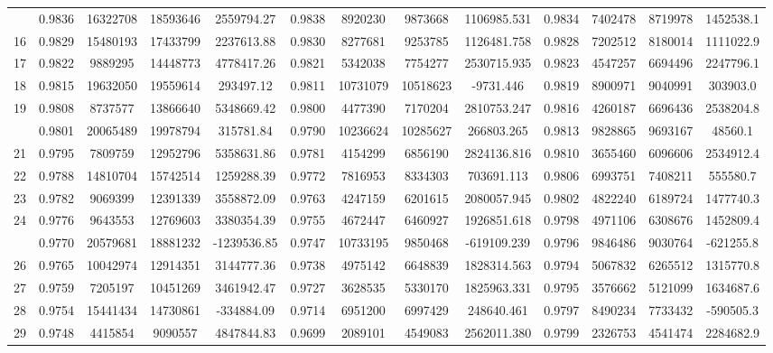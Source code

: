 \documentclass[
  12pt,
]{article}
\begin{document}
\begin{longtable}[t]{lcccccccccccc}
\addlinespace
15 & 0.9836 & 16322708 & 18593646 & 2559794.27 & 0.9838 & 8920230 & 9873668 & 1106985.531 & 0.9834 & 7402478 & 8719978 & 1452538.1\\
16 & 0.9829 & 15480193 & 17433799 & 2237613.88 & 0.9830 & 8277681 & 9253785 & 1126481.758 & 0.9828 & 7202512 & 8180014 & 1111022.9\\
17 & 0.9822 & 9889295 & 14448773 & 4778417.26 & 0.9821 & 5342038 & 7754277 & 2530715.935 & 0.9823 & 4547257 & 6694496 & 2247796.1\\
18 & 0.9815 & 19632050 & 19559614 & 293497.12 & 0.9811 & 10731079 & 10518623 & -9731.446 & 0.9819 & 8900971 & 9040991 & 303903.0\\
19 & 0.9808 & 8737577 & 13866640 & 5348669.42 & 0.9800 & 4477390 & 7170204 & 2810753.247 & 0.9816 & 4260187 & 6696436 & 2538204.8\\
\addlinespace
20 & 0.9801 & 20065489 & 19978794 & 315781.84 & 0.9790 & 10236624 & 10285627 & 266803.265 & 0.9813 & 9828865 & 9693167 & 48560.1\\
21 & 0.9795 & 7809759 & 12952796 & 5358631.86 & 0.9781 & 4154299 & 6856190 & 2824136.816 & 0.9810 & 3655460 & 6096606 & 2534912.4\\
22 & 0.9788 & 14810704 & 15742514 & 1259288.39 & 0.9772 & 7816953 & 8334303 & 703691.113 & 0.9806 & 6993751 & 7408211 & 555580.7\\
23 & 0.9782 & 9069399 & 12391339 & 3558872.09 & 0.9763 & 4247159 & 6201615 & 2080057.945 & 0.9802 & 4822240 & 6189724 & 1477740.3\\
24 & 0.9776 & 9643553 & 12769603 & 3380354.39 & 0.9755 & 4672447 & 6460927 & 1926851.618 & 0.9798 & 4971106 & 6308676 & 1452809.4\\
\addlinespace
25 & 0.9770 & 20579681 & 18881232 & -1239536.85 & 0.9747 & 10733195 & 9850468 & -619109.239 & 0.9796 & 9846486 & 9030764 & -621255.8\\
26 & 0.9765 & 10042974 & 12914351 & 3144777.36 & 0.9738 & 4975142 & 6648839 & 1828314.563 & 0.9794 & 5067832 & 6265512 & 1315770.8\\
27 & 0.9759 & 7205197 & 10451269 & 3461942.47 & 0.9727 & 3628535 & 5330170 & 1825963.331 & 0.9795 & 3576662 & 5121099 & 1634687.6\\
28 & 0.9754 & 15441434 & 14730861 & -334884.09 & 0.9714 & 6951200 & 6997429 & 248640.461 & 0.9797 & 8490234 & 7733432 & -590505.3\\
29 & 0.9748 & 4415854 & 9090557 & 4847844.83 & 0.9699 & 2089101 & 4549083 & 2562011.380 & 0.9799 & 2326753 & 4541474 & 2284682.9\\

\end{longtable}
\end{document}

